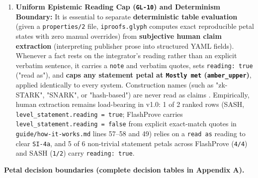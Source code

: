 \documentclass[11pt,letterpaper]{article}
\begin{document}
\begin{enumerate}
\item \textbf{Uniform Epistemic Reading Cap (\texttt{GL-10}) and Determinism Boundary:} It is essential to separate \textbf{deterministic table evaluation} (given a \texttt{properties/\allowbreak{}2} file, \texttt{iproofs.\allowbreak{}glyph} computes exact reproducible petal states with zero manual overrides) from \textbf{subjective human claim extraction} (interpreting publisher prose into structured YAML fields). Whenever a fact rests on the integrator's reading rather than an explicit verbatim sentence, it carries a \texttt{note} and verbatim quotes, sets \texttt{reading: true} ("read as"), and \textbf{caps any statement petal at \texttt{Mostly met} (\texttt{amber\_\allowbreak{}upper})}, applied identically to every system. Construction names (such as "zk-STARK", "SNARK", or "hash-based") are never read as claims \cite{iproofs2026}. Empirically, human extraction remains load-bearing in v1.0: 1 of 2 ranked rows (SASH, \texttt{level\_\allowbreak{}statement.\allowbreak{}reading = true}; FlashProve carries \texttt{level\_\allowbreak{}statement.\allowbreak{}reading = false} from explicit exact-match quotes in \texttt{guide/\allowbreak{}how-\allowbreak{}it-\allowbreak{}works.\allowbreak{}md} lines 57--58 and 49) relies on a \texttt{read as} reading to clear \texttt{SI-4a}, and 5 of 6 non-trivial statement petals across FlashProve (\texttt{4/\allowbreak{}4}) and SASH (\texttt{1/\allowbreak{}2}) carry \texttt{reading: true}.
\end{enumerate}

\textbf{Petal decision boundaries (complete decision tables in Appendix A).}
\end{document}
